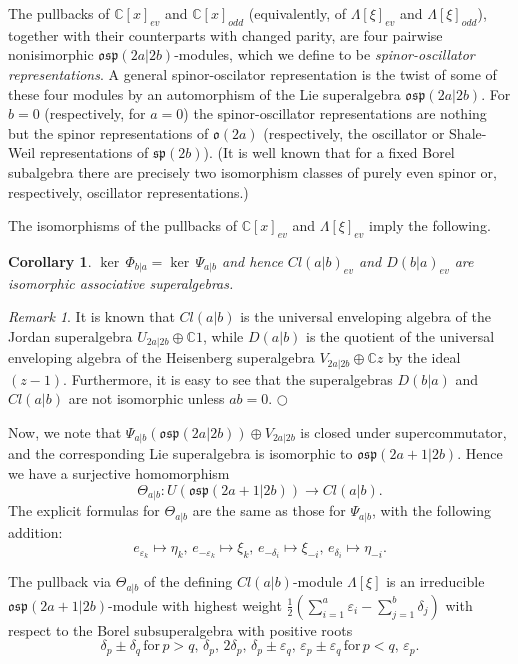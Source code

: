 \documentclass[12pt]{amsart}
\theoremstyle{plain} %
\numberwithin{equation}{section}
\theoremstyle{definition}
\theoremstyle{remark}
\newtheorem{remark}[definition]{Remark} %
\theoremstyle{plain} %
\newtheorem{corollary}[definition]{Corollary}
\renewcommand{\sp}{\mathfrak{sp}}
\newcommand{\so}{\mathfrak{o}}
\newcommand{\osp}{\mathfrak{osp}}
\newcommand{\C}{\mathbb{C}}
\begin{document}
     
      The  pullbacks of  $\mathbb{C}[x]_{ev}$ and $\mathbb{C}[x]_{odd}$ (equivalently,  of 
     $\Lambda [\xi]_{ev}$ and  $\Lambda [\xi]_{odd}$),
         together with their counterparts with changed parity, are four pairwise nonisimorphic $\osp(2a|2b)$-modules, which we define to be \emph{spinor-oscillator representations}. A general spinor-oscilator representation is the twist of some of these four modules by an automorphism of the Lie superalgebra $\osp(2a|2b)$. For $b=0$ (respectively, for $a=0$) the spinor-oscillator representations are nothing but the spinor representations of $\so(2a)$ (respectively, the oscillator or Shale-Weil representations of $\sp(2b)$). (It is well known that for a fixed Borel subalgebra there are precisely two isomorphism classes of purely even spinor or, respectively, oscillator representations.)
         

The isomorphisms of the pullbacks of $\C [x]_{ev}$ and  $\Lambda [\xi]_{ev}$ imply the following.
    \begin{corollary}\label{isomorphism_even} $\ker \, \Phi_{b|a}=\ker\, \Psi_{a|b}$ and hence $Cl(a|b)_{ev}$ and $D(b|a)_{ev}$ are isomorphic associative superalgebras.
    \end{corollary}
  
    \begin{remark} It is known that $Cl(a|b)$ is the universal enveloping algebra of the Jordan superalgebra $U_{2a|2b}\oplus\mathbb C 1$, while $D(a|b)$ is the quotient of the universal enveloping algebra of the Heisenberg
      superalgebra $V_{2a|2b}\oplus\mathbb C z$ by the ideal $(z-1)$.  Furthermore, it is easy to see that the superalgebras $D(b|a)$ and $Cl(a|b)$ are not isomorphic unless $ab=0$.
    \hfill${\bigcirc}$    \end{remark}

    Now, we note that $\Psi_{a|b}(\osp(2a|2b))\oplus V_{2a|2b}$ is closed under supercommutator, and the corresponding Lie superalgebra is isomorphic to $\osp(2a+1|2b)$. Hence we have a surjective homomorphism
    $$\Theta_{a|b}: U(\osp(2a+1|2b))\to Cl(a|b).$$
     The explicit formulas for  $\Theta_{a|b}$ are the same as those for $\Psi_{a|b}$, with the following addition:
    $$e_{\varepsilon_k} \mapsto \eta_{k}, \, e_{-\varepsilon_k }  \mapsto \xi_{k}, \, e_{-\delta_i } \mapsto \xi_{-i}, \, e_{\delta_{i}} \mapsto \eta_{-i}.$$


    The pullback via $\Theta_{a|b}$ of the defining $Cl(a|b)$-module  $\Lambda[\xi]$  is an irreducible $\osp(2a+1|2b)$-module with highest weight  $\frac{1}{2}\left( \sum_{i=1}^a \varepsilon_i - \sum_{j=1}^b \delta_j \right)$ with respect to the Borel subsuperalgebra with positive roots 
$$\delta_p\pm\delta_q\,\text{for}\,p>q,\,\delta_p,\,2\delta_{p},\,\delta_p\pm\varepsilon_q,\,\varepsilon_p\pm\varepsilon_q\,\text{for}\,p<q,\,\varepsilon_p.$$
\end{document}
